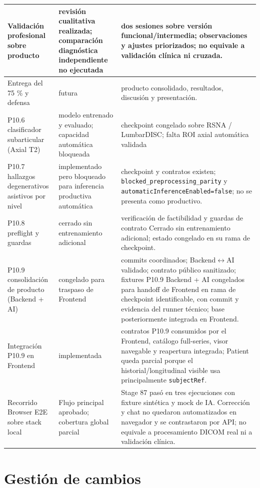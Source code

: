 \begin{longtable}{|p{}|p{}|p{}|}
\hline
Validación profesional sobre producto & revisión cualitativa realizada; comparación diagnóstica independiente no ejecutada & dos sesiones sobre versión funcional/intermedia; observaciones y ajustes priorizados; no equivale a validación clínica ni cruzada. \\
\hline
Entrega del 75 \% y defensa & futura & producto consolidado, resultados, discusión y presentación. \\
\hline
P10.6 clasificador subarticular (Axial T2) & modelo entrenado y evaluado; capacidad automática bloqueada & checkpoint congelado sobre RSNA / LumbarDISC; falta ROI axial automática validada \\
\hline
P10.7 hallazgos degenerativos asistivos por nivel & implementado pero bloqueado para inferencia productiva automática & checkpoint y contratos existen; \texttt{blocked\_preprocessing\_parity} y \texttt{automaticInferenceEnabled=false}; no se presenta como productivo. \\
\hline
P10.8 preflight y guardas & cerrado sin entrenamiento adicional & verificación de factibilidad y guardas de contrato Cerrado sin entrenamiento adicional; estado congelado en su rama de checkpoint. \\
\hline
P10.9 consolidación de producto (Backend + AI) & congelado para traspaso de Frontend & commits coordinados; Backend\ensuremath{\leftrightarrow}AI validado; contrato público sanitizado; fixtures P10.9 Backend + AI congelados para handoff de Frontend en rama de checkpoint identificable, con commit y evidencia del runner técnico; base posteriormente integrada en Frontend. \\
\hline
Integración P10.9 en Frontend & implementada & contratos P10.9 consumidos por el Frontend, catálogo full-series, visor navegable y reapertura integrada; Patient queda parcial porque el historial/longitudinal visible usa principalmente \texttt{subjectRef}. \\
\hline
Recorrido Browser E2E sobre stack local & Flujo principal aprobado; cobertura global parcial & Stage 87 pasó en tres ejecuciones con fixture sintética y mock de IA. Corrección y chat no quedaron automatizados en navegador y se contrastaron por API; no equivale a procesamiento DICOM real ni a validación clínica. \\
\hline
\end{longtable}
\endgroup

\section{Gestión de cambios}

